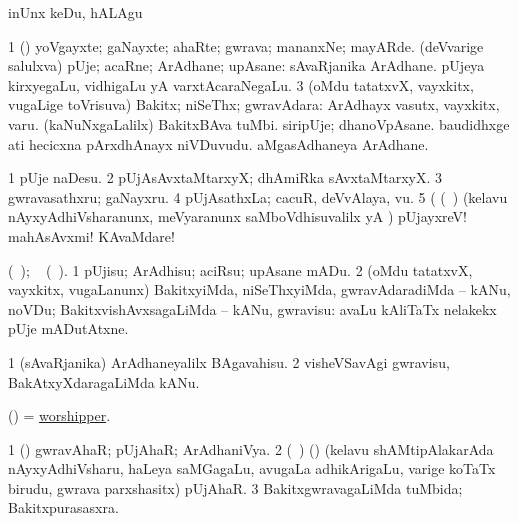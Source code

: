 \begin{center}
\noindent
\gl{\akirx}
\expl{}
\bmng
inUnx keDu, hALAgu 
\emng
\eentry

\bentry 
{} 
\gl{\nA}
\expl{}
\bmng
\bnum
\num{1} (\pArxparx) yoVgayxte; gaNayxte; ahaRte; gwrava; mananxNe; mayARde. 
\banum
{} (deVvarige salulxva) pUje; acaRne; ArAdhane; upAsane:  sAvaRjanika ArAdhane. 
 pUjeya kirxyegaLu, vidhigaLu yA varxtAcaraNegaLu. 
\eanum
\numie
\num{3} (oMdu tatatxvX, vayxkitx, \mo vugaLige toVrisuva) Bakitx; niSeThx; gwravAdara:  ArAdhayx vasutx, vayxkitx, \mo varu.  (kaNuNxgaLalilx) BakitxBAva tuMbi.  siripUje; dhanoVpAsane.  baudidhxge ati hecicxna pArxdhAnayx niVDuvudu.  aMgasAdhaneya ArAdhane. 
\enum
\emng

\noindent
\gl{\pagu}
\expl{}
\bmng
\bnum
\num{1}  pUje naDesu. 
\num{2}  pUjAsAvxtaMtarxyX; dhAmiRka sAvxtaMtarxyX. 
\num{3}  gwravasathxru; gaNayxru. 
\num{4}  pUjAsathxLa; cacuR, deVvAlaya, \mo vu. 
\num{5}  (    (\kanmu\ \birx) (kelavu nAyxyAdhiVsharanunx, meVyaranunx saMboVdhisuvalilx yA \hA) pUjayxreV! mahAsAvxmi! KAvaMdare! 
\enum
\emng
\eentry

\bentry 
{} 
\gl{\sakirx}
\expl{\eng{[} \BU\ matutx \BUkaq}
  (\ame\ ); \vakaq\  (\ame\ )\eng{]}.\bmng
\bnum
\num{1} pUjisu; ArAdhisu; aciRsu; upAsane mADu. 
\num{2} (oMdu tatatxvX, vayxkitx, \mo vugaLanunx) BakitxyiMda, niSeThxyiMda, gwravAdaradiMda -- kANu, noVDu; BakitxvishAvxsagaLiMda -- kANu, gwravisu:  avaLu kAliTaTx nelakekx pUje mADutAtxne. 
\enum
\emng

\noindent
\gl{\akirx}
\expl{}
\bmng
\bnum
\num{1} (sAvaRjanika) ArAdhaneyalilx BAgavahisu. 
\num{2} visheVSavAgi gwravisu, BakAtxyXdaragaLiMda kANu. 
\enum
\emng
\eentry

\bentry
{} 
\gl{\nA}
\expl{}
\bmng
(\ame) = \hyperlink{worshipper}{worshipper}. 
\emng
\eentry

\bentry
{} 
\gl{\gu}
\expl{}
\bmng
\bnum
\num{1} (\pArxparx) gwravAhaR; pUjAhaR; ArAdhaniVya. 
\num{2} (\sA\ ) (\birx) (kelavu shAMtipAlakarAda nAyxyAdhiVsharu, haLeya saMGagaLu, avugaLa adhikArigaLu, \mo varige koTaTx birudu, gwrava parxshasitx) pUjAhaR. 
\num{3} BakitxgwravagaLiMda tuMbida; Bakitxpurasasxra. 
\enum
\emng
\eentry


\end{center}
